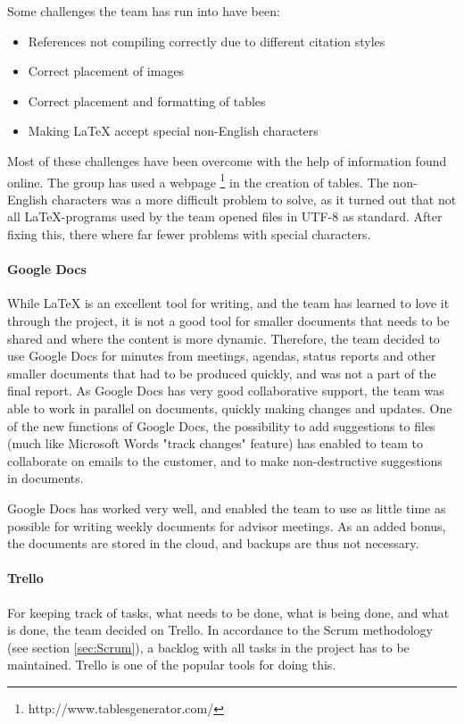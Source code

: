 \documentclass[11pt,a4paper,titlepage,oneside]{report}
\begin{document}
Some challenges the team has run into have been:
\begin{itemize}
\item References not compiling correctly due to different citation styles
\item Correct placement of images
\item Correct placement and formatting of tables
\item Making LaTeX accept special non-English characters
\end{itemize}

Most of these challenges have been overcome with the help of information found online. The group has used a webpage \footnote{http://www.tablesgenerator.com/} in the creation of tables. The non-English characters was a more difficult problem to solve, as it turned out that not all \LaTeX-programs used by the team opened files in UTF-8 as standard. After fixing this, there where far fewer problems with special characters.

\paragraph{Google Docs}
While \LaTeX{} is an excellent tool for writing, and the team has learned to love it through the project, it is not a good tool for smaller documents that needs to be shared and where the content is more dynamic. Therefore, the team decided to use Google Docs for minutes from meetings, agendas, status reports and other smaller documents that had to be produced quickly, and was not a part of the final report. As Google Docs has very good collaborative support, the team was able to work in parallel on documents, quickly making changes and updates. One of the new functions of Google Docs, the possibility to add suggestions to files (much like Microsoft Words "track changes" feature) has enabled to team to collaborate on emails to the customer, and to make non-destructive suggestions in documents.


Google Docs has worked very well, and enabled the team to use as little time as possible for writing weekly documents for advisor meetings. As an added bonus, the documents are stored in the cloud, and backups are thus not necessary. 

\paragraph{Trello}
For keeping track of tasks, what needs to be done, what is being done, and what is done, the team decided on Trello. In accordance to the Scrum methodology (see section \ref{sec:Scrum}), a backlog with all tasks in the project has to be maintained. Trello is one of the popular tools for doing this. 
\end{document}
